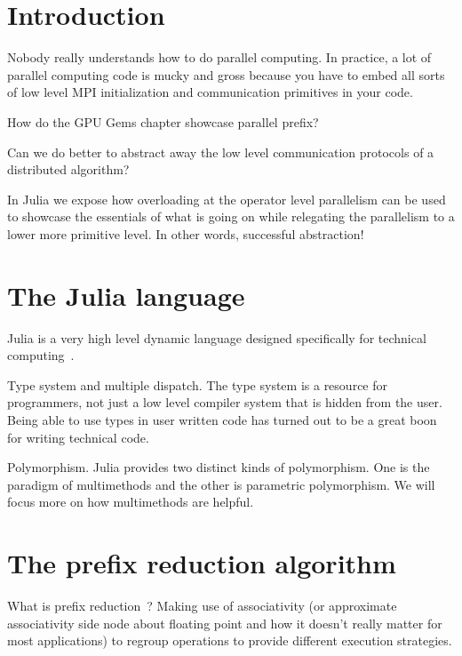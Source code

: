 \documentclass{sig-alternate}
\begin{document}



\section{Introduction}
Nobody really understands how to do parallel computing. In practice, a lot of parallel computing code is mucky and gross because you have to embed all sorts of low level MPI initialization and communication primitives in your code.

How do the GPU Gems chapter showcase parallel prefix?

Can we do better to abstract away the low level communication protocols of a distributed algorithm?

In Julia we expose how overloading at the operator level parallelism can be used to showcase the essentials of what is going on while relegating the parallelism to a lower more primitive level. In other words, successful abstraction!

\section{The Julia language}

Julia is a very high level dynamic language designed specifically for technical computing~\cite{Bezanson2012}.

Type system and multiple dispatch. The type system is a resource for programmers, not just a low level compiler system that is hidden from the user. Being able to use types in user written code has turned out to be a great boon for writing technical code.

Polymorphism. Julia provides two distinct kinds of polymorphism. One is the paradigm of multimethods and the other is parametric polymorphism. We will focus more on how multimethods are helpful.

\section{The prefix reduction algorithm}

What is prefix reduction~\cite{Iverson1962,Ladner1980,Brent1982}? Making use of associativity (or approximate associativity side node about floating point and how it doesn't really matter for most applications)  to regroup operations to provide different execution strategies.
\end{document}
